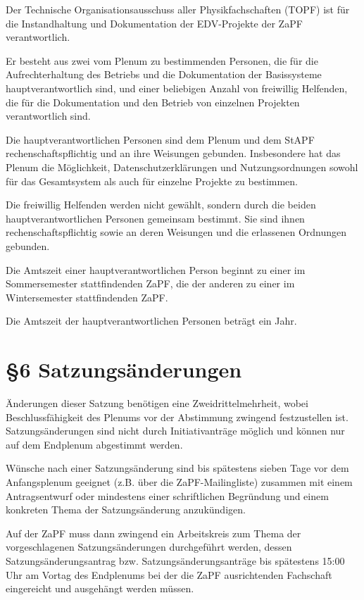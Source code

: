 \documentclass[12pt,oneside]{scrartcl}
\begin{document}
Der Technische Organisationsausschuss aller Physikfachschaften (TOPF) ist für
die Instandhaltung und Dokumentation der EDV-Projekte der ZaPF verantwortlich.

Er besteht aus zwei vom Plenum zu bestimmenden Personen, die für die
Aufrechterhaltung des Betriebs und die Dokumentation der Basissysteme
hauptverantwortlich sind, und einer beliebigen Anzahl von freiwillig
Helfenden, die für die Dokumentation und den Betrieb von einzelnen Projekten
verantwortlich sind.

Die hauptverantwortlichen Personen sind dem Plenum und dem StAPF
rechenschaftspflichtig und an ihre Weisungen gebunden.
Insbesondere hat das Plenum die Möglichkeit, Datenschutzerklärungen und
Nutzungsordnungen sowohl für das Gesamtsystem als auch für einzelne Projekte zu
bestimmen.

Die freiwillig Helfenden werden nicht gewählt, sondern durch die beiden
hauptverantwortlichen Personen gemeinsam bestimmt.
Sie sind ihnen rechenschaftspflichtig sowie an deren Weisungen und die
erlassenen Ordnungen gebunden.

Die Amtszeit einer hauptverantwortlichen Person beginnt zu einer im
Sommersemester stattfindenden ZaPF, die der anderen zu einer im Wintersemester
stattfindenden ZaPF.

Die Amtszeit der hauptverantwortlichen Personen beträgt ein Jahr.


\section{§6 Satzungsänderungen%
  \label{satzungsanderungen}%
}

Änderungen dieser Satzung benötigen eine Zweidrittelmehrheit, wobei Beschlussfähigkeit
des Plenums vor der Abstimmung zwingend festzustellen ist.
Satzungsänderungen sind nicht durch Initiativanträge möglich und können nur auf
dem Endplenum abgestimmt werden.

Wünsche nach einer Satzungsänderung sind bis spätestens sieben Tage vor dem
Anfangsplenum geeignet (z.B. über die ZaPF-Mailingliste)
zusammen mit einem Antragsentwurf oder mindestens einer schriftlichen
Begründung und einem konkreten Thema der Satzungsänderung anzukündigen.

Auf der ZaPF muss dann zwingend ein Arbeitskreis zum Thema der vorgeschlagenen
Satzungsänderungen durchgeführt werden, dessen Satzungsänderungsantrag bzw.
Satzungsänderungsanträge bis spätestens 15:00 Uhr am Vortag des Endplenums bei
der die ZaPF ausrichtenden Fachschaft eingereicht und ausgehängt werden müssen.
\end{document}

